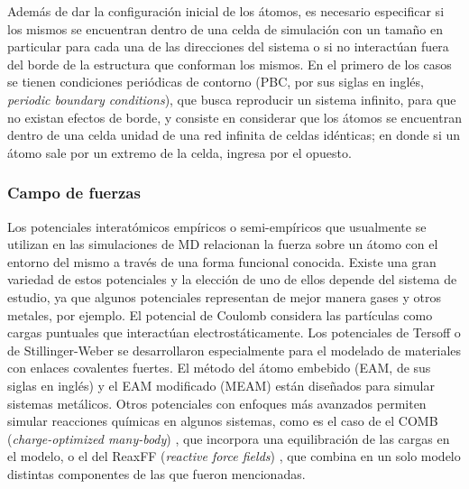 Además de dar la configuración inicial de los átomos, es necesario especificar si
los mismos se encuentran dentro de una celda de simulación con un tamaño en
particular para cada una de las direcciones del sistema o si no interactúan fuera
del borde de la estructura que conforman los mismos. En el primero de los casos
se tienen condiciones periódicas de contorno (PBC, por sus siglas en inglés, 
\textit{periodic boundary conditions}), que busca reproducir un sistema infinito,
para que no existan efectos de borde, y consiste en considerar que los átomos se 
encuentran dentro de una celda unidad de una red infinita de celdas idénticas; en
donde si un átomo sale por un extremo de la celda, ingresa por el opuesto. %


\subsubsection{Campo de fuerzas}

Los potenciales interatómicos empíricos o semi-empíricos que usualmente se 
utilizan en las simulaciones de MD relacionan la fuerza sobre un átomo con el 
entorno del mismo a través de una forma funcional conocida. Existe una gran 
variedad de estos potenciales y la elección de uno de ellos depende del sistema 
de estudio, ya que algunos potenciales representan de mejor manera gases y otros 
metales, por ejemplo. El potencial de Coulomb \cite{coulomb} considera las 
partículas como cargas puntuales que interactúan electrostáticamente. Los 
potenciales de Tersoff \cite{tersoff} o de Stillinger-Weber 
\cite{stillinger-weber} se desarrollaron especialmente para el modelado de 
materiales con enlaces covalentes fuertes.%
El método del átomo embebido (EAM, de sus siglas en inglés) \cite{eam} 
y el EAM modificado (MEAM) \cite{meam} están diseñados para simular sistemas 
metálicos. Otros potenciales con enfoques más avanzados permiten simular
reacciones químicas en algunos sistemas, como es el caso de el COMB 
(\textit{charge-optimized many-body}) \cite{comb}, que incorpora una 
equilibración de las cargas en el modelo, o el del ReaxFF (\textit{reactive 
force fields}) \cite{reaxff}, que combina en un solo modelo distintas 
componentes de las que fueron mencionadas. 

